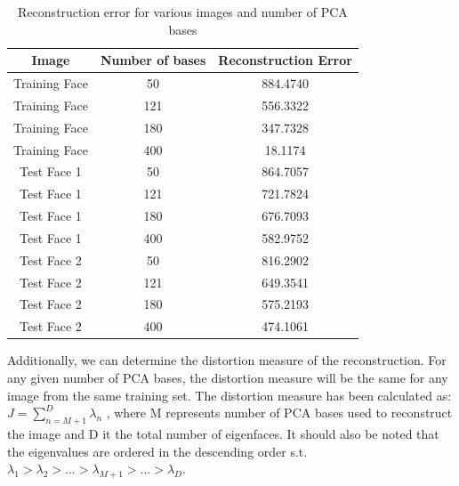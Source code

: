\documentclass[10pt,twocolumn,letterpaper]{article}
\begin{document}
\begin{table}[H]
\begin{center}
\begin{tabular}{||c c c||}
\hline
\bf Image & \bf Number of bases & \bf Reconstruction Error\\ [0.5ex]
\hline \hline
Training Face & 50 & 884.4740 \\ [0.5ex]
\hline
Training Face & 121 & 556.3322\\ [0.5ex]
\hline
Training Face & 180 & 347.7328\\ [0.5ex]
\hline
Training Face & 400 & 18.1174\\ [0.5ex]
\hline \hline
Test Face 1 & 50 & 864.7057\\ [0.5ex]
\hline
Test Face 1 & 121 & 721.7824\\ [0.5ex]
\hline
Test Face 1 & 180 & 676.7093\\ [0.5ex]
\hline
Test Face 1 & 400 & 582.9752\\ [0.5ex]
\hline \hline
Test Face 2 & 50 & 816.2902\\ [0.5ex]
\hline
Test Face 2 & 121 & 649.3541\\ [0.5ex]
\hline
Test Face 2 & 180 & 575.2193\\ [0.5ex]
\hline
Test Face 2 & 400 & 474.1061\\ [0.5ex]
\hline
\end{tabular}
\end{center}
\caption{Reconstruction error for various images and number of PCA bases} \label{tab:RecoError}
\end{table}

Additionally, we can determine the distortion measure of the reconstruction. For any given number of PCA bases, the distortion measure will be the same for any image from the same training set. The distortion measure has been calculated as:
$J = \sum_{n=M+1}^{D} \lambda_n$
, where M represents number of PCA bases used to reconstruct the image and D it the total number of eigenfaces. It should also be noted that the eigenvalues are ordered in the descending order s.t. $\lambda_1 > \lambda_2 > ... > \lambda_{M+1} > ... > \lambda_D$.
\end{document}
